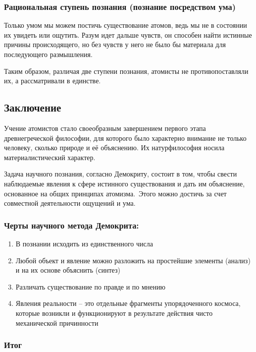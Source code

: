 \documentclass[a4paper, 14pt]{extreport}
\begin{document}
\subsubsection{Рациональная ступень познания (познание посредством ума)}

Только умом мы можем постичь существование атомов, ведь мы не в
состоянии их увидеть или ощутить. Разум идет дальше чувств, он способен
найти истинные причины происходящего, но без чувств у него не было бы
материала для последующего размышления.

Таким образом, различая две ступени познания, атомисты не
противопоставляли их, а рассматривали в единстве.

\subsection{Заключение}

Учение атомистов стало своеобразным завершением первого этапа
древнегреческой философии, для которого было характерно внимание не
только человеку, сколько природе и её объяснению. Их натурфилософия
носила материалистический характер.

Задача научного познания, согласно Демокриту, состоит в том, чтобы
свести наблюдаемые явления к сфере истинного существования и дать им
объяснение, основанное на общих принципах атомизма.~Этого можно достичь
за счет совместной деятельности ощущений и ума.~

\subsubsection{Черты научного метода Демокрита:}

\begin{enumerate}
\def\labelenumi{\arabic{enumi}.}

\item
  В познании исходить из единственного числа
\item
  Любой объект и явление можно разложить на простейшие элементы (анализ)
  и на их основе объяснить (синтез)
\item
  Различать существование по правде и по мнению
\item
  Явления реальности -- это отдельные фрагменты упорядоченного космоса,
  которые возникли и функционируют в результате действия чисто
  механической причинности
\end{enumerate}

\subsubsection{Итог}
\end{document}
